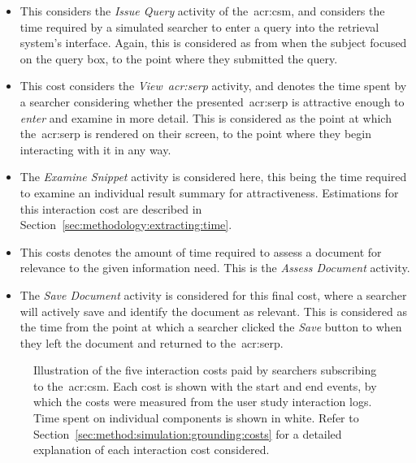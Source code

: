 \begin{itemize}
    \item{ This considers the \emph{Issue Query} activity of the~\gls{acr:csm}, and considers the time required by a simulated searcher to enter a query into the retrieval system's interface. Again, this is considered as from when the subject focused on the query box, to the point where they submitted the query.}
    \item{ This cost considers the \emph{View~\gls{acr:serp}} activity, and denotes the time spent by a searcher considering whether the presented~\gls{acr:serp} is attractive enough to \emph{enter} and examine in more detail. This is considered as the point at which the~\gls{acr:serp} is rendered on their screen, to the point where they begin interacting with it in any way.}
    \item{ The \emph{Examine Snippet} activity is considered here, this being the time required to examine an individual result summary for attractiveness. Estimations for this interaction cost are described in Section~\ref{sec:methodology:extracting:time}.}
    \item{ This costs denotes the amount of time required to assess a document for relevance to the given information need. This is the \emph{Assess Document} activity.}
    \item{ The \emph{Save Document} activity is considered for this final cost, where a searcher will actively save and identify the document as relevant. This is considered as the time from the point at which a searcher clicked the \emph{Save} button to when they left the document and returned to the~\gls{acr:serp}.}
\end{itemize}

\begin{figure}[t!]
    \centering
    \caption[Interaction costs]{Illustration of the five interaction costs paid by searchers subscribing to the~\gls{acr:csm}. Each cost is shown with the start and end events, by which the costs were measured from the user study interaction logs. Time spent on individual components is shown in white. Refer to Section~\ref{sec:method:simulation:grounding:costs} for a detailed explanation of each interaction cost considered.}
    \label{fig:costs}
\end{figure}

